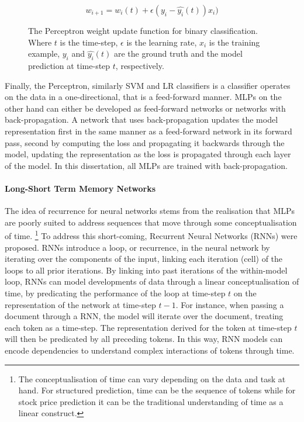 \begin{figure}[h]
  \begin{equation}\label{eq:perceptron_update}
    w_{i+1} = w_i(t) + \epsilon (y_i - \hat{y_i}(t))x_{i})
  \end{equation}
  \caption[The Perceptron weight update function.]{The Perceptron weight update function for binary classification. Where $t$ is the time-step, $\epsilon$ is the learning rate, $x_i$ is the training example, $y_i$ and $\hat{y_i}(t)$ are the ground truth and the model prediction at time-step $t$, respectively.}
\end{figure}

Finally, the Perceptron, similarly SVM and LR classifiers is a classifier operates on the data in a one-directional, that is a feed-forward manner. MLPs on the other hand can either be developed as feed-forward networks or networks with back-propagation.
A network that uses back-propagation updates the model representation first in the same manner as a feed-forward network in its forward pass, second by computing the loss and propagating it backwards through the model, updating the representation as the loss is propagated through each layer of the model.
In this dissertation, all MLPs are trained with back-propagation.

\paragraph{Long-Short Term Memory Networks}
The idea of recurrence for neural networks stems from the realisation that MLPs are poorly suited to address sequences that move through some conceptualisation of time.
\footnote{The conceptualisation of time can vary depending on the data and task at hand. For structured prediction, time can be the sequence of tokens while for stock price prediction it can be the traditional understanding of time as a linear construct.}
To address this short-coming, Recurrent Neural Networks (RNNs) were proposed. RNNs introduce a loop, or recurrence, in the neural network by iterating over the components of the input, linking each iteration (cell) of the loops to all prior iterations.
By linking into past iterations of the within-model loop, RNNs can model developments of data through a linear conceptualisation of time, by predicating the performance of the loop at time-step $t$ on the representation of the network at time-step $t-1$.
For instance, when passing a document through a RNN, the model will iterate over the document, treating each token as a time-step.
The representation derived for the token at time-step $t$ will then be predicated by all preceding tokens.
In this way, RNN models can encode dependencies to understand complex interactions of tokens through time.

